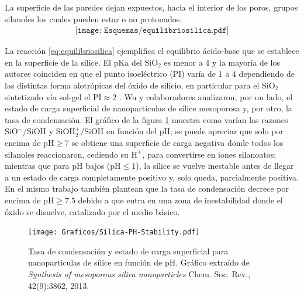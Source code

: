 	La superficie de las paredes dejan expuestos, hacia el interior de los poros, grupos silanoles los cuales pueden estar o no protonados.\cite{Brinker1990,Soler-Illia2011} 
			\begin{equation}
				\begin{aligned}
				\texttt{[image: Esquemas/equilibriosilica.pdf]}
				\label{eq:equilibriosilica}
				\end{aligned}
				\end{equation}

	La reacción \ref{eq:equilibriosilica} ejemplifica el equilibrio ácido-base que se establece en la superficie de la sílice. El pKa del $\text{SiO}_2$ es menor a 4 y la mayoría de los autores coinciden en que el punto isoeléctrico (PI) varía de $1$ a $4$ dependiendo de  las distintas forma alotrópicas del óxido de silicio, en particular para el SiO$_2$ sintetizado vía sol-gel el $\text{PI}\approx 2$ \cite{Kosmulski2002,Kosmulski2014,Schwarz1984,Si-HanWu2013}.
	Wu y colaboradores\cite{Si-HanWu2013} analizaron, por un lado, el estado de carga superficial de nanoparticulas de sílice mesoporosa y, por otro, la tasa de condensación. El gráfico de la figura \ref{fig:silica_ph} muestra como varían las razones  $\text{SiO}^{-}/\text{SiOH}$ y $\text{SiOH}_2^{+}/\text{SiOH}$ en función del pH; se puede apreciar que solo por encima de $\text{pH}\geq7$ se obtiene una superficie de carga negativa donde todos los silanoles reaccionaron, cediendo su $\text{H}^{+}$, para convertirse en iones silanoatos; mientras que para pH bajos ($\text{pH}\leq1$), la sílice se vuelve inestable antes de llegar a un estado de carga completamente positivo y, solo queda, parcialmente positiva. En el mismo trabajo\cite{Si-HanWu2013} también plantean que la tasa de condensación decrece por encima de $\text{pH}\geq7.5$ debido a que entra en una zona de inestabilidad donde el óxido se disuelve, catalizado por el medio básico.
		\begin{figure}[th!]
			\centering
 	       	\texttt{[image: Graficos/Silica-PH-Stability.pdf]}
	    	\caption[Tasa de condensación y estado de carga superficial]{Tasa de condensación y estado de carga superficial para nanoparticulas de sílice en función de pH. Gráfico extraído de \textit{Synthesis of mesoporous silica nanoparticles} Chem. Soc. Rev., 42(9):3862, 2013.\cite{Si-HanWu2013}}
	       	\label{fig:silica_ph}
	    	\end{figure}
